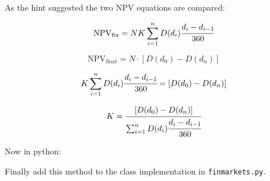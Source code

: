 \begin{Answer}
As the hint suggested the two NPV equations are compared:

\[\mathrm{NPV}_{\mathrm{fix}} = NK \sum_{i=1}^{n}D(d_{i})\cfrac{d_i - d_{i-1}}{360}\]

\[\mathrm{NPV}_{\mathrm{float}} = N \cdot [D(d_0) - D(d_n)]\]

\[K \sum_{i=1}^{n}D(d_{i})\cfrac{d_i - d_{i-1}}{360} = [D(d_0) - D(d_n)]\]

\[K = \cfrac{[D(d_0) - D(d_n)]}{\sum_{i=1}^{n}D(d_{i})\cfrac{d_i - d_{i-1}}{360}}\]

Now in python:

\begin{Shaded}
\begin{Highlighting}[]
\OperatorTok{=} 
         \NormalTok{(}\NormalTok{, }\NormalTok{(}
\OperatorTok{=} \NormalTok{.payment_dates[i}\NormalTok{] }
\OperatorTok{=} 
\OperatorTok{=}\OperatorTok{-}\OperatorTok{/} 
\OperatorTok{=}
\OperatorTok{+=}\OperatorTok{*}
\OperatorTok{=}\NormalTok{.payment_dates[}\NormalTok{]) }\OperatorTok{-} 
\NormalTok{.payment_dates[}\OperatorTok{-}\NormalTok{]))}

        \OperatorTok{/}
\end{Highlighting}
\end{Shaded}

Finally add this method to the class implementation in \texttt{finmarkets.py}.
\end{Answer}
